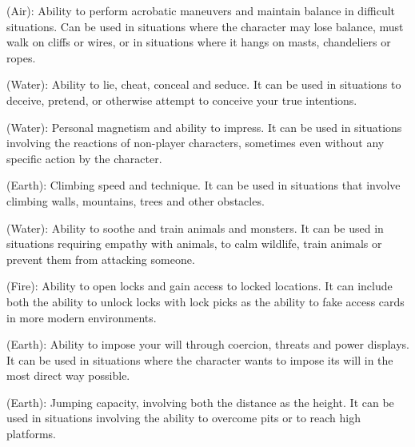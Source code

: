 \begin{multicols}{2}
\begin{ffcolpage}
 (Air): Ability to perform acrobatic maneuvers and maintain balance in difficult situations. Can be used in situations where the character may lose balance, must walk on cliffs or wires, or in situations where it hangs on masts, chandeliers or ropes.
\end{ffcolpage} \pw \begin{ffcolpage}
 (Water): Ability to lie, cheat, conceal and seduce. It can be used in situations to deceive, pretend, or otherwise attempt to conceive your true intentions.
\end{ffcolpage} \pw \begin{ffcolpage}
 (Water): Personal magnetism and ability to impress. It can be used in situations involving the reactions of non-player characters, sometimes even without any specific action by the character.
\end{ffcolpage} \pw \begin{ffcolpage}
 (Earth): Climbing speed and technique. It can be used in situations that involve climbing walls, mountains, trees and other obstacles.
\end{ffcolpage} \pw \begin{ffcolpage}
 (Water): Ability to soothe and train animals and monsters. It can be used in situations requiring empathy with animals, to calm wildlife, train animals or prevent them from attacking someone.
\end{ffcolpage} \pw \begin{ffcolpage}
 (Fire): Ability to open locks and gain access to locked locations. It can include both the ability to unlock locks with lock picks as the ability to fake access cards in more modern environments.
\end{ffcolpage} \pw \begin{ffcolpage}
 (Earth): Ability to impose your will through coercion, threats and power displays. It can be used in situations where the character wants to impose its will in the most direct way possible.
\end{ffcolpage} \pw \begin{ffcolpage}
 (Earth): Jumping capacity, involving both the distance as the height. It can be used in situations involving the ability to overcome pits or to reach high platforms.
\end{ffcolpage} \pw \begin{ffcolpage}

\end{ffcolpage}
\end{multicols}
